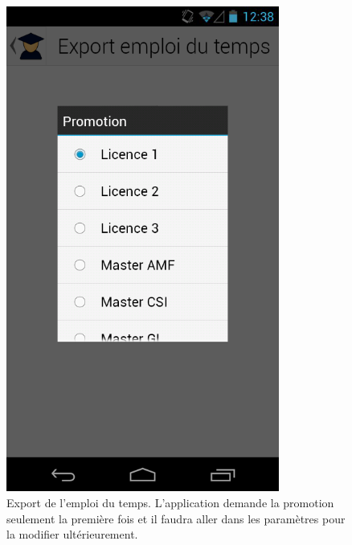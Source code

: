 \documentclass [pdftex,12pt] {report}
\begin{document}
\begin{figure}
  \begin{minipage}[t]{8cm}
    \centering
    \includegraphics[width=0.8\textwidth]{resources/ui_preview/09}
    \caption{Export de l'emploi du temps. L'application demande la promotion seulement la première fois et il faudra aller dans les paramètres pour la modifier ultérieurement.}
    \label{fig:09}
  \end{minipage}
  \hspace{+20pt}
  \begin{minipage}[t]{8cm}
    \centering

\end{minipage}
\end{figure}
\end{document}
